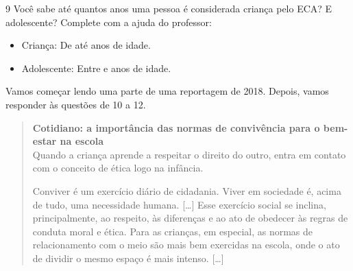 \num{9} Você sabe até quantos anos uma pessoa é considerada criança pelo ECA? E
adolescente? Complete com a ajuda do professor:

\begin{itemize}
\item Criança: De  até  anos de idade.

\item Adolescente: Entre  e  anos de idade.
\end{itemize}


Vamos começar lendo uma parte de uma reportagem de 2018. Depois, vamos responder às questões de 10 a 12.

\begin{quote}
\textbf{Cotidiano: a importância das normas de convivência para o bem-estar na escola}\\
Quando a criança aprende a respeitar o direito do outro, entra em
contato com o conceito de ética logo na infância.

Conviver é um exercício diário de cidadania. Viver em sociedade é, acima
de tudo, uma necessidade humana. {[}\ldots{}{]} Esse exercício social se inclina,
principalmente, ao respeito, às diferenças e ao ato de obedecer às
regras de conduta moral e ética. Para as crianças, em especial, as
normas de relacionamento com o meio são mais bem exercidas na escola,
onde o ato de dividir o mesmo espaço é mais intenso. {[}\ldots{}{]}

\end{quote}

